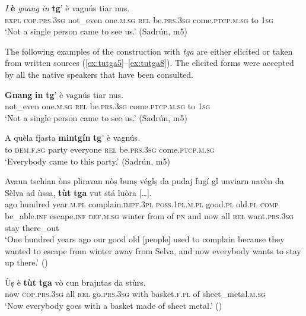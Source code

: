 \ea
\gll \textit{I} \textbf{è} \textit{gnang} \textit{in} \textbf{tg}' è vagnús tiar nus.\\
\textsc{expl} \textsc{cop.prs.3sg} not\_even one.\textsc{m.sg} \textsc{rel} be.\textsc{prs.3sg} come.\textsc{ptcp.m.sg} to \textsc{1sg}\\
\glt `Not a single person came to see us.' (Sadrún, m5)
\z

The following examples of the construction with \textit{tga} are either elicited or taken from written sources (\ref{ex:tutga5}--\ref{ex:tutga8}). The elicited forms were accepted by all the native speakers that have been consulted.

\ea
\label{ex:tutga5}
\gll \textbf{Gnang} \textbf{in} \textbf{tg}' è vagnús tiar nus.\\
not\_even one.\textsc{m.sg} \textsc{rel} be.\textsc{prs.3sg} come.\textsc{ptcp.m.sg} to \textsc{1sg}\\
\glt `Not a single person came to see us.' (Sadrún, m5)
\z

\ea
\label{ex:tutga6}
\gll A quèla fjasta \textbf{mintgín} \textbf{tg}' è vagnús.   \\
to \textsc{dem.f.sg} party everyone \textsc{rel} be.\textsc{prs.3sg} come.\textsc{ptcp.m.sg} \\
\glt `Everybody came to this party.' (Sadrún, m5)
\z

\ea
\label{ex:tutga7}
\gll  Avaun tschian òns pliravan nòṣ bunṣ véglṣ da pudaj fugí gl unviarn navèn da Sèlva ad ùssa, \textbf{tùt} \textbf{tga} vut stá luòra\footnotemark {} […].\\
ago hundred year.\textsc{m.pl} complain.\textsc{impf.3pl} \textsc{poss.1pl.m.pl} good.\textsc{pl} old.\textsc{pl} \textsc{comp} be\_able.\textsc{inf} escape.\textsc{inf} \textsc{def.m.sg} winter from of \textsc{pn} and now all \textsc{rel} want.\textsc{prs.3sg} stay there\_out \\
\glt `One hundred years ago our good old [people] used to complain because they wanted to escape from winter away from Selva, and now everybody wants to stay up there.' (\citealt[69]{Berther2007})
\z

\ea
\label{ex:tutga8}
\gll  Ùṣ è \textbf{tùt} \textbf{tga} vò cun brajntas da stùrs.\\
now \textsc{cop.prs.3sg} all \textsc{rel} go.\textsc{prs.3sg} with basket.\textsc{f.pl} of sheet\_metal\textsc{.m.sg}\\
\glt `Now everybody goes with a basket made of sheet metal.' ()
\z

